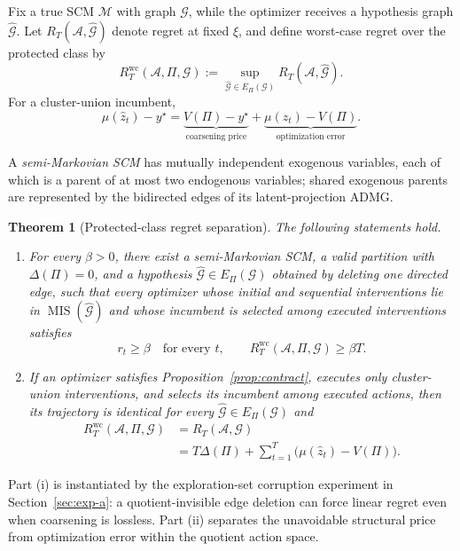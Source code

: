 \documentclass[twoside]{article}
\newtheorem{theorem}{Theorem}
\newcommand{\Gg}{\mathcal{G}}
\begin{document}
Fix a true SCM \(\mathcal M\) with graph \(\Gg\), while the optimizer receives a hypothesis graph \(\widehat{\Gg}\). Let \(R_T(\mathcal A,\widehat{\Gg})\) denote regret at fixed \(\xi\), and define worst-case regret over the protected class by
\[
 R_T^{\mathrm{wc}}(\mathcal A,\Pi,\Gg)
 :=\sup_{\widehat{\Gg}\in E_\Pi(\Gg)}
 R_T(\mathcal A,\widehat{\Gg}).
 \]
For a cluster-union incumbent,
\begin{equation}
 \mu(\hat z_t)-y^\star
 =\underbrace{V(\Pi)-y^\star}_{\text{coarsening price}}
 +\underbrace{\mu(\hat z_t)-V(\Pi)}_{\text{optimization error}}.
\label{eq:regret-decomposition}
\end{equation}
 
A \emph{semi-Markovian SCM} has mutually independent exogenous variables, each of which is a parent of at most two endogenous variables; shared exogenous parents are represented by the bidirected edges of its latent-projection ADMG.

\begin{theorem}[Protected-class regret separation]
\label{thm:separation}
The following statements hold.
\begin{enumerate}[label=(\roman*),leftmargin=1.6em,itemsep=2pt,topsep=2pt]
 \item For every \(\beta>0\), there exist a semi-Markovian SCM, a valid
 partition with \(\Delta(\Pi)=0\), and a hypothesis
 \(\widehat{\Gg}\in E_\Pi(\Gg)\) obtained by deleting one directed edge, such
 that every optimizer whose initial and sequential interventions lie in
 \(\operatorname{MIS}(\widehat{\Gg})\) and whose incumbent is selected among
 executed interventions satisfies
 \[
  r_t\ge\beta\quad\text{for every }t,
  \qquad
  R_T^{\mathrm{wc}}(\mathcal A,\Pi,\Gg)\ge\beta T.
 \]
\item If an optimizer satisfies Proposition~\ref{prop:contract}, executes only cluster-union interventions, and selects its incumbent among executed actions, then its trajectory is identical for every \(\widehat{\Gg}\in E_\Pi(\Gg)\) and
 \[
 \begin{aligned}
 R_T^{\mathrm{wc}}(\mathcal A,\Pi,\Gg)
 &=R_T(\mathcal A,\Gg)\\
 &=T\Delta(\Pi)
 +\sum_{t=1}^{T}\bigl(\mu(\hat z_t)-V(\Pi)\bigr).
 \end{aligned}
 \]
\end{enumerate}
\end{theorem}

Part (i) is instantiated by the exploration-set corruption experiment in Section~\ref{sec:exp-a}: a quotient-invisible edge deletion can force linear regret even when coarsening is lossless. Part (ii) separates the unavoidable structural price from optimization error within the quotient action space.
\end{document}
